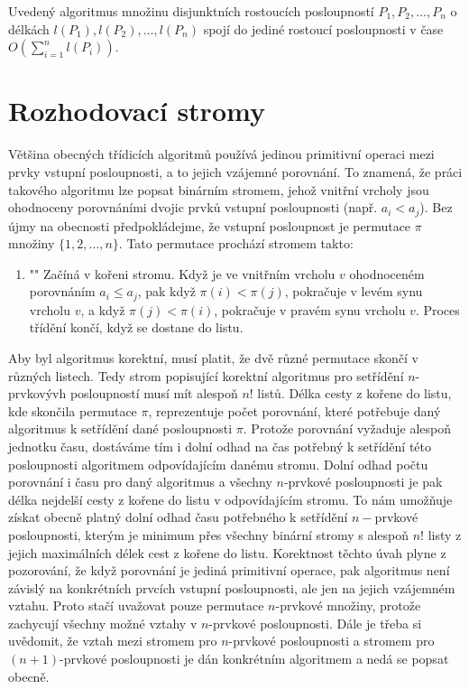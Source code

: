 \documentclass[a4paper,12pt]{article}
\begin{document}
\begin{veta}Uvedený algoritmus množinu 
disjunktních rostoucích 
posloupností $P_1,P_2,\dots,P_n$ o délkách $l(P_1),l(P_2)
,\dots,l(P_n)$ spojí 
do jediné rostoucí posloupnosti v čase 
$O(\sum_{i=1}^nl(P_i))$.
\end{veta}

\section{{Rozhodovací stromy}}

Většina obecných třídicích algoritmů 
používá jedinou primitivní operaci mezi prvky vstupní 
posloupnosti, a to jejich vzá\-jemné porov\-nání.  
To znamená, že práci 
takového algoritmu lze po\-psat 
binárním stro\-mem, jehož vnitřní vrcholy jsou ohodnoceny 
porovnáními dvojic prvků vstupní posloupnosti 
(např. $a_i<a_j$). Bez újmy na obecnosti předpokládejme, že 
vstupní posloupnost je permutace $\pi$
množiny $\{1,2,\dots,n\}$. Tato permutace prochází 
stromem takto:
\begin{enumerate}
\item"{}"
Začíná v kořeni stromu. Když je ve vnitřním vrcholu $
v$ 
ohodnoceném porovnáním $a_i\le a_j$, pak když $\pi (i)
<\pi (j)$, 
pokračuje v levém synu vrcholu $v$, a když $\pi (j)<\pi (
i)$, 
pokračuje v pravém synu vrcholu $v$. Proces 
třídění končí, když se dostane do listu.
\end{enumerate}
Aby byl algoritmus korektní, musí platit, že dvě 
různé permutace skončí v různých 
listech.  Tedy strom popisující korektní algoritmus 
pro setřídění $n$-prvkovývh posloupností musí mít 
alespoň $n!$ listů.  Délka cesty z kořene do listu, 
kde skončila permutace $\pi$, reprezentuje počet porovnání, které potřebuje 
daný algoritmus k setřídění dané posloupnosti $
\pi$. Protože porovnání 
vyžaduje alespoň jednotku času, dostáváme tím i dolní odhad na 
čas potřebný k setřídění této posloupnosti  algoritmem 
odpovídajícím danému stromu. Dolní odhad  počtu 
porovnání i času pro daný algoritmus a všechny  
$n$-prvkové posloupnosti je pak délka nejdelší cesty z kořene 
do listu v odpovídajícím stromu. To nám umožňuje 
získat obecně platný dolní odhad času potřebného k setřídění 
$n-$prvkové posloupnosti, kterým je  
minimum přes všechny binární stromy s alespoň $n!$ 
listy z jejich maximálních délek cest z kořene do listu. 
Korekt\-nost těchto úvah plyne z pozorování, 
že když porovnání je jediná primi\-tivní operace, pak 
algoritmus není závislý na konkrétních prvcích vstup\-ní 
posloupnosti, ale jen na jejich vzájemném vzta\-hu. 
Proto stačí uvažovat pouze permutace $n$-prvkové množiny, 
protože za\-chycují všechny možné vztahy v $n$-prvkové 
posloupnosti. Dá\-le je třeba si uvědomit, že vztah mezi 
stromem pro $n$-prvkové posloupnosti a stromem pro 
$(n+1)$-prvkové posloupnosti je dán konkrétním algoritmem a 
nedá se popsat obecně. 
\end{document}
